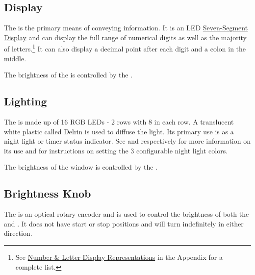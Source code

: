 \subsection{Display} \label{Display}

The  is the primary means of conveying information.  It is an LED
\href{https://en.wikipedia.org/wiki/Seven-segment\_display}{Seven-Segment Display}
and can display the full range of numerical digits as well as the majority of
letters.\footnote{ See \hyperref[Display Digits]{Number \& Letter Display Representations}
in the Appendix for a complete list.}  It can also display a decimal point after
each digit and a colon in the middle.

\par\medskip

The brightness of the  is controlled by the
\hyperref[Brightness Knob]{}.

\subsection{Lighting} \label{Lighting}

The  is made up of \num{16} RGB LEDs - 2 rows with \num{8} in each row.
A translucent white plastic called Delrin is used to diffuse the light.  Its
primary use is as a night light or timer status indicator.
See \hyperref[Clock]{} and \hyperref[Timer]{} respectively for
more information on its use and \hyperref[Set Night Light]{} for
instructions on setting the \num{3} configurable night light colors.

\par\medskip

The brightness of the  window is controlled by the
\hyperref[Brightness Knob]{}.

\subsection{Brightness Knob} \label{Brightness Knob}

The  is an optical rotary encoder and is used to control the brightness
of both the \hyperref[Display]{} and \hyperref[Lighting]{}. It
does not have start or stop positions and will turn indefinitely in either
direction.

